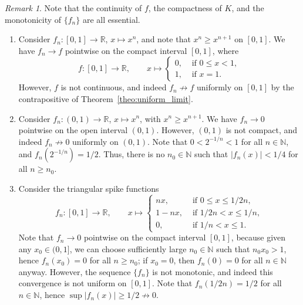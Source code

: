 \documentclass[11pt]{article}
\def\R{\mathbb{R}}
\def\N{\mathbb{N}}
\theoremstyle{definition}
\theoremstyle{remark}
\newtheorem*{remark}{Remark}
\begin{document}
    \begin{remark}
        Note that the continuity of $f$, the compactness of $K$, and the monotonicity
        of $\{f_n\}$ are all essential.
        \begin{enumerate}
            \item Consider $f_n\colon [0, 1] \to \R$, $x \mapsto x^n$, and note that
            $x^n \geq x^{n + 1}$ on $[0, 1]$. We have $f_n \to f$ pointwise on the
            compact interval $[0, 1]$, where \[
                f\colon [0, 1]\to \R, \qquad x \mapsto \begin{cases}
                    0, &\text{ if }0 \leq x < 1, \\
                    1, &\text{ if }x = 1.
                \end{cases}
            \] However, $f$ is not continuous, and indeed $f_n \not\to f$ uniformly
            on $[0, 1]$ by the contrapositive of Theorem~\ref{theo:uniform_limit}.
            
            \item Consider $f_n\colon (0, 1) \to \R$, $x \mapsto x^n$, with $x^n \geq
            x^{n + 1}$. We have $f_n \to 0$ pointwise on the open interval $(0, 1)$.
            However, $(0, 1)$ is not compact, and indeed $f_n \not\to 0$ uniformly on
            $(0, 1)$. Note that $0 < 2^{-1 / n} < 1$ for all $n \in \N$, and
            $f_n(2^{-1 / n}) = 1 / 2$. Thus, there is no $n_0 \in \N$ such that
            $|f_n(x)| < 1 / 4$ for all $n \geq n_0$.

            \item Consider the triangular spike functions \[
                f_n\colon [0, 1] \to \R, \qquad x \mapsto \begin{cases}
                    nx, &\text{ if } 0 \leq x \leq 1 / 2n, \\
                    1 - nx, &\text{ if } 1 /2n < x \leq 1 / n, \\
                    0, &\text{ if } 1 / n < x \leq 1.
                \end{cases}
            \] Note that $f_n \to 0$ pointwise on the compact interval $[0, 1]$,
            because given any $x_0 \in (0, 1]$, we can choose sufficiently large $n_0
            \in \N$ such that $n_0x_0 > 1$, hence $f_n(x_0) = 0$ for all $n \geq
            n_0$; if $x_0 = 0$, then $f_n(0) = 0$ for all $n \in \N$ anyway. However,
            the sequence $\{f_n\}$ is not monotonic, and indeed this convergence is
            not uniform on $[0, 1]$. Note that $f_n(1 / 2n) = 1 / 2$ for all $n \in
            \N$, hence $\sup |f_n(x)| \geq 1 / 2 \not\to 0$.
        \end{enumerate}
    \end{remark}
\end{document}

